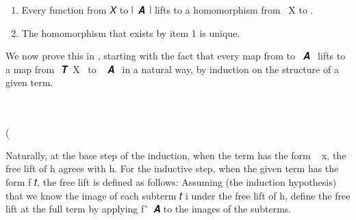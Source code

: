 \begin{enumerate}
\item Every function from \ab 𝑋 to ∣~\ab 𝑨~\af ∣ lifts to a homomorphism from ~\ab X to .
\item The homomorphism that exists by item 1 is unique.
\end{enumerate}

We now prove this in \agda, starting with the fact that every map from  to
~\ab 𝑨~ lifts to a map from ~\af 𝑻~\ab X~ to ~\ab
𝑨~ in a natural way, by induction on the structure of a given term. 
\ccpad
\begin{code}%
\>[1]\AgdaSpace{}%
\AgdaSymbol{:}\AgdaSpace{}%
\AgdaSymbol{(}\AgdaSpace{}%
\AgdaSymbol{:}\AgdaSpace{}%
\AgdaSpace{}%
\AgdaSpace{}%
\AgdaSymbol{)(}\AgdaSpace{}%
\AgdaSymbol{:}\AgdaSpace{}%
\AgdaSpace{}%
\AgdaSpace{}%
\AgdaSpace{}%
\AgdaSpace{}%
\AgdaSymbol{)}\AgdaSpace{}%
\AgdaSpace{}%
\AgdaSpace{}%
\AgdaSpace{}%
\AgdaSpace{}%
\AgdaSpace{}%
\AgdaSpace{}%
\AgdaSpace{}%
\AgdaSpace{}%
\<%
\\
%
%
\>[1]\AgdaSpace{}%
\AgdaSymbol{\AgdaUnderscore{}}\AgdaSpace{}%
\AgdaSpace{}%
\AgdaSymbol{(}\AgdaSpace{}%
\AgdaSymbol{)}\AgdaSpace{}%
\AgdaSymbol{=}\AgdaSpace{}%
\AgdaSpace{}%
\<%
\\
%
%
\>[1]\AgdaSpace{}%
\AgdaSpace{}%
\AgdaSpace{}%
\AgdaSymbol{(}\AgdaSpace{}%
\AgdaSpace{}%
\AgdaSymbol{)}\AgdaSpace{}%
\AgdaSymbol{=}\AgdaSpace{}%
\AgdaSymbol{(}\AgdaSpace{}%
\AgdaSpace{}%
\AgdaSymbol{)}\AgdaSpace{}%
(\AgdaSpace{}%
\AgdaSpace{}%
\AgdaSpace{}%
\AgdaSpace{}%
\AgdaSpace{}%
\AgdaSpace{}%
\AgdaSymbol{(}\AgdaSpace{}%
\AgdaSymbol{))}\<%
\end{code}
\ccpad
Naturally, at the base step of the induction, when the term has the form ~\ab
x, the free lift of \ab h agrees with \ab h.  For the inductive step, when the
given term has the form  \ab f \ab 𝑡, the free lift is defined as
follows: Assuming (the induction hypothesis) that we know the image of each
subterm \ab 𝑡 \ab i under the free lift of \ab h, define the free lift at the
full term by applying \ab f~\af ̂~\ab 𝑨 to the images of the subterms.

